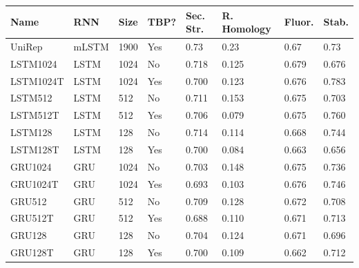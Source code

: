 \documentclass[a4paper,12pt]{article}
\begin{document}
\begin{table}[H]
\centering
{}
\begin{tabularx}{\linewidth}{Llllllll}
\toprule
\textbf{Name} & \textbf{RNN} & \textbf{Size} & \textbf{TBP?} & \textbf{Sec. Str.} & \textbf{R. Homology} & \textbf{Fluor.} & \textbf{Stab.} \\ \hline
UniRep        & mLSTM        & 1900          & Yes           & 0.73               & 0.23                 & 0.67            & 0.73           \\
LSTM1024      & LSTM         & 1024          & No            & 0.718              & 0.125                & 0.679           & 0.676          \\
LSTM1024T     & LSTM         & 1024          & Yes           & 0.700              & 0.123                & 0.676           & 0.783          \\
LSTM512       & LSTM         & 512           & No            & 0.711              & 0.153                & 0.675           & 0.703          \\
LSTM512T      & LSTM         & 512           & Yes           & 0.706              & 0.079                & 0.675           & 0.760          \\
LSTM128       & LSTM         & 128           & No            & 0.714              & 0.114                & 0.668           & 0.744          \\
LSTM128T      & LSTM         & 128           & Yes           & 0.700              & 0.084                & 0.663           & 0.656          \\
GRU1024       & GRU          & 1024          & No            & 0.703              & 0.148                & 0.675           & 0.736          \\
GRU1024T      & GRU          & 1024          & Yes           & 0.693              & 0.103                & 0.676           & 0.746          \\
GRU512        & GRU          & 512           & No            & 0.709              & 0.128                & 0.672           & 0.708          \\
GRU512T       & GRU          & 512           & Yes           & 0.688              & 0.110                & 0.671           & 0.713          \\
GRU128        & GRU          & 128           & No            & 0.704              & 0.124                & 0.671           & 0.696          \\
GRU128T       & GRU          & 128           & Yes           & 0.700              & 0.109                & 0.662           & 0.712          \\

\end{tabularx}
\end{table}
\end{document}
